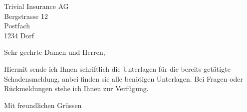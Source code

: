 \documentclass[fontsize=12pt, paper=a4]{scrlttr2}
\begin{document}
\begin{letter} {
					Trivial Insurance AG\\
					Bergstrasse 12 \\
					Postfach \\
					1234 Dorf 
				}

\opening{Sehr geehrte Damen und Herren,}

	Hiermit sende ich Ihnen schriftlich die Unterlagen für die bereits getätigte Schadensmeldung, anbei finden sie alle benötigen Unterlagen. Bei Fragen oder Rückmeldungen stehe ich Ihnen zur Verfügung.

\closing{Mit freundlichen Grüssen}

\hfill


\end{letter}
\end{document}
